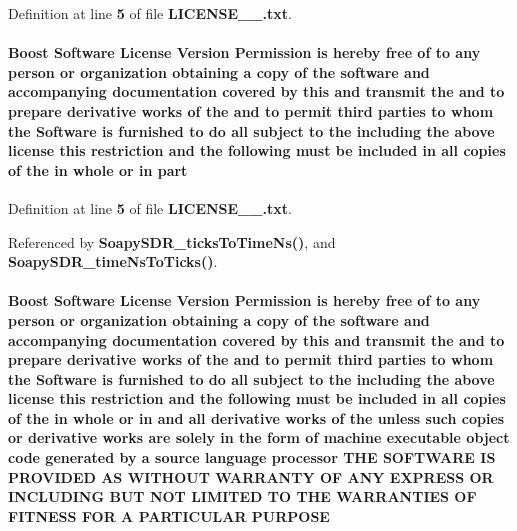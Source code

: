 Definition at line {\bf 5} of file {\bf L\+I\+C\+E\+N\+S\+E\+\_\+\_.\+txt}.

\paragraph[{part}]{\setlength{\rightskip}{0pt plus 5cm}Boost {\bf Software} License Version Permission is hereby free of to any person or organization obtaining a copy of the software and accompanying documentation covered by this and transmit the and to prepare derivative works of the and to permit third parties to whom the {\bf Software} is furnished to do {\bf all} subject to the including the above {\bf license} this restriction and the {\bf following} must be included in {\bf all} copies of the in whole or in part}\label{LICENSE__1__0_8txt_aaa59da54a97b56480c5d5c61e3fbfbe3}


Definition at line {\bf 5} of file {\bf L\+I\+C\+E\+N\+S\+E\+\_\+\_.\+txt}.



Referenced by {\bf Soapy\+S\+D\+R\+\_\+ticks\+To\+Time\+Ns()}, and {\bf Soapy\+S\+D\+R\+\_\+time\+Ns\+To\+Ticks()}.

\paragraph[{P\+U\+R\+P\+O\+SE}]{\setlength{\rightskip}{0pt plus 5cm}Boost {\bf Software} License Version Permission is hereby free of to any person or organization obtaining a copy of the software and accompanying documentation covered by this and transmit the and to prepare derivative works of the and to permit third parties to whom the {\bf Software} is furnished to do {\bf all} subject to the including the above {\bf license} this restriction and the {\bf following} must be included in {\bf all} copies of the in whole or in and {\bf all} derivative works of the unless such copies or derivative works are solely in the form of machine executable object code generated by a source language processor T\+HE S\+O\+F\+T\+W\+A\+RE {\bf IS} P\+R\+O\+V\+I\+D\+ED AS W\+I\+T\+H\+O\+UT W\+A\+R\+R\+A\+N\+TY OF A\+NY E\+X\+P\+R\+E\+SS OR I\+N\+C\+L\+U\+D\+I\+NG B\+UT N\+OT L\+I\+M\+I\+T\+ED TO T\+HE W\+A\+R\+R\+A\+N\+T\+I\+ES OF F\+I\+T\+N\+E\+SS F\+OR A P\+A\+R\+T\+I\+C\+U\+L\+AR P\+U\+R\+P\+O\+SE}\label{LICENSE__1__0_8txt_aa708dac3959aad55f7e2a2dc06ab5483}


